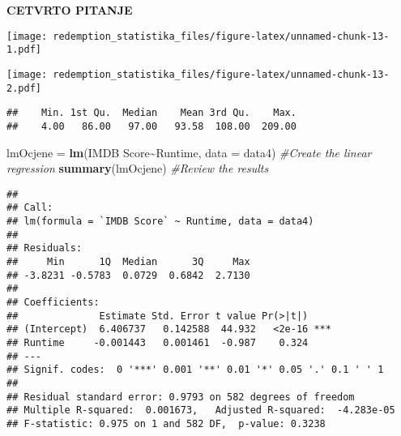 \documentclass[
]{article}
\newenvironment{Shaded}{\begin{snugshade}}{\end{snugshade}}
\newcommand{\AttributeTok}[1]{\textcolor[rgb]{0.13,0.29,0.53}{#1}}
\newcommand{\CommentTok}[1]{\textcolor[rgb]{0.56,0.35,0.01}{\textit{#1}}}
\newcommand{\FunctionTok}[1]{\textcolor[rgb]{0.13,0.29,0.53}{\textbf{#1}}}
\newcommand{\NormalTok}[1]{#1}
\newcommand{\OtherTok}[1]{\textcolor[rgb]{0.56,0.35,0.01}{#1}}
\newcommand{\SpecialCharTok}[1]{\textcolor[rgb]{0.81,0.36,0.00}{\textbf{#1}}}
\newcommand{\StringTok}[1]{\textcolor[rgb]{0.31,0.60,0.02}{#1}}
\begin{document}
\textbf{CETVRTO PITANJE}

\begin{Shaded}
\end{Shaded}

\texttt{[image: redemption\_statistika\_files/figure-latex/unnamed-chunk-13-1.pdf]}

\begin{Shaded}
\end{Shaded}

\texttt{[image: redemption\_statistika\_files/figure-latex/unnamed-chunk-13-2.pdf]}

\begin{Shaded}
\end{Shaded}

\begin{verbatim}
##    Min. 1st Qu.  Median    Mean 3rd Qu.    Max. 
##    4.00   86.00   97.00   93.58  108.00  209.00
\end{verbatim}

\begin{Shaded}
\begin{Highlighting}[]
\NormalTok{lmOcjene }\OtherTok{=} \FunctionTok{lm}\NormalTok{(}\StringTok{\textasciigrave{}}\AttributeTok{IMDB Score}\StringTok{\textasciigrave{}}\SpecialCharTok{\textasciitilde{}}\NormalTok{Runtime, }\AttributeTok{data =}\NormalTok{ data4) }\CommentTok{\#Create the linear regression}
\FunctionTok{summary}\NormalTok{(lmOcjene) }\CommentTok{\#Review the results}
\end{Highlighting}
\end{Shaded}

\begin{verbatim}
## 
## Call:
## lm(formula = `IMDB Score` ~ Runtime, data = data4)
## 
## Residuals:
##     Min      1Q  Median      3Q     Max 
## -3.8231 -0.5783  0.0729  0.6842  2.7130 
## 
## Coefficients:
##              Estimate Std. Error t value Pr(>|t|)    
## (Intercept)  6.406737   0.142588  44.932   <2e-16 ***
## Runtime     -0.001443   0.001461  -0.987    0.324    
## ---
## Signif. codes:  0 '***' 0.001 '**' 0.01 '*' 0.05 '.' 0.1 ' ' 1
## 
## Residual standard error: 0.9793 on 582 degrees of freedom
## Multiple R-squared:  0.001673,   Adjusted R-squared:  -4.283e-05 
## F-statistic: 0.975 on 1 and 582 DF,  p-value: 0.3238
\end{verbatim}
\end{document}
